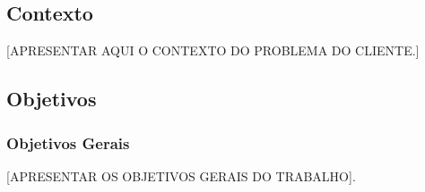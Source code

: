 
\subsection{Contexto} %
\label{sub:contexto}
[APRESENTAR AQUI O CONTEXTO DO PROBLEMA DO CLIENTE.]
%
%
%

\subsection{Objetivos} %
\label{sub:objetivos}
\subsubsection{Objetivos Gerais}

[APRESENTAR OS OBJETIVOS GERAIS DO TRABALHO].


